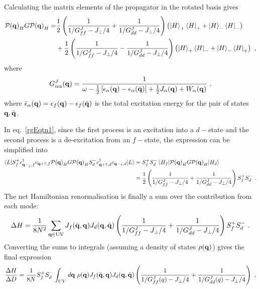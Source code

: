 Calculating the matrix elements of the propagator in the rotated basis gives
\begin{equation}\begin{aligned}\label{PGP}
	\mathcal{P({\bf q})}_H G \mathcal{P({\bf q})}_H =& \frac{1}{2}\left(\frac{1}{1/G^J_{ff} - J_\perp/4} + \frac{1}{1/G^J_{dd} - J_\perp/4}\right)\left(\ket{H}_+\bra{H}_+ + \ket{H}_-\bra{H}_-\right)\\
													&+ \frac{1}{2}\left(\frac{1}{1/G^J_{ff} - J_\perp/4} - \frac{1}{1/G^J_{dd} - J_\perp/4}\right)\left(\ket{H}_+\bra{H}_- + \ket{H}_-\bra{H}_+\right)~,
\end{aligned}\end{equation}
where
\begin{equation}\begin{aligned}
	G^{J}_{\alpha\alpha}({\bf q}) = \frac{1}{\omega - \frac{1}{2}\left[\epsilon_\alpha({\bf q}) - \epsilon_\alpha(\bar{\bf q})\right] + \frac{1}{2}J_\alpha({\bf q}) + W_\alpha({\bf q})}~.
\end{aligned}\end{equation}
where \(\bar\epsilon_\alpha({\bf q}) = \epsilon_f({\bf q}) - \epsilon_f(\bar{\bf q})\) is the total excitation energy for the pair of states \({\bf q},\bar{\bf q}\).

In eq.~\ref{rgEqtn1}, since the first process is an excitation into a \(d-\)state and the second process is a de-excitation from an \(f-\)state, the expression can be simplified into
\begin{equation}\begin{aligned}\label{rgEqtn2}
	\braket{L | S_f^+ c^\dagger_{{\bf q-}_\downarrow,f}c_{{\bf q+}\uparrow,f} \mathcal{P({\bf q})}_H G \mathcal{P({\bf q})}_H S_d^- c^\dagger_{{\bf q+}\uparrow,d}c_{{\bf q-}\downarrow,d} | L } &= S_f^+ S_d^- \braket{H_f | \mathcal{P({\bf q})}_H G \mathcal{P({\bf q})}_H | H_d} \\
																																																 &= \frac{1}{2}\left(\frac{1}{1/G^J_{ff} - J_\perp/4} + \frac{1}{1/G^J_{dd} - J_\perp/4}\right) S_f^+ S_d^-~.
\end{aligned}\end{equation}
The net Hamiltonian renormalisation is finally a sum over the contribution from each mode:
\begin{equation}\begin{aligned}
	\Delta H = \frac{1}{8N^2} \sum_{{\bf q} \in \text{UV}}J_f(\bar{\bf q},{\bf q}) J_d({\bf q},\bar{\bf q})\left(\frac{1}{1/G^J_{ff} - J_\perp/4} + \frac{1}{1/G^J_{dd} - J_\perp/4}\right) S_f^+ S_d^-~.
\end{aligned}\end{equation}
Converting the sums to integrals (assuming a density of states \(\rho({\bf q})\)) gives the final expression
\begin{equation}\begin{aligned}
	\frac{\Delta H}{\Delta D} = \frac{1}{8N} S_f^+ S_d^-\int_{UV} d{\bf q} ~\rho({\bf q}) J_f(\bar{\bf q},{\bf q}) J_d({\bf q},\bar{\bf q})\left(\frac{1}{1/G^J_{ff}(q) - J_\perp/4} + \frac{1}{1/G^J_{dd}(q) - J_\perp/4}\right)~.
\end{aligned}\end{equation}


